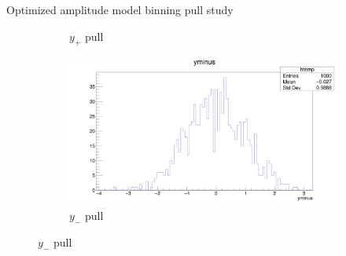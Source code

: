 \documentclass{beamer}
\begin{document}
\begin{frame}{Optimized amplitude model binning pull study}
\begin{figure}
\begin{subfigure}{0.5\textwidth}
      \caption{$y_+$ pull}
    \end{subfigure}%
    \begin{subfigure}{0.5\textwidth}
      \includegraphics[width = 1.0\textwidth]{OptimizedAmplitudePulls/yminus1K1K.png}
      \caption{$y_-$ pull}
    \end{subfigure}
  \end{figure}
\end{frame}
\end{document}
